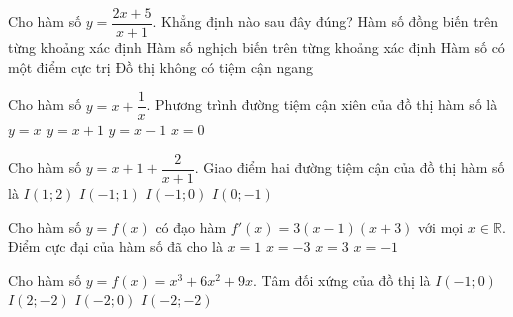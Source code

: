 \newpage
\begin{ex}
	Cho hàm số $y = \dfrac{2x + 5}{x + 1}$. Khẳng định nào sau đây đúng?
	\choice
	{Hàm số đồng biến trên từng khoảng xác định}
	{\True Hàm số nghịch biến trên từng khoảng xác định}
	{Hàm số có một điểm cực trị}
	{Đồ thị không có tiệm cận ngang}
\end{ex}

\begin{ex}
	Cho hàm số $y = x + \dfrac{1}{x}$. Phương trình đường tiệm cận xiên của đồ thị hàm số là
	\choice
	{\True $y = x$}
	{$y = x + 1$}
	{$y = x - 1$}
	{$x = 0$}
\end{ex}

\begin{ex}
	Cho hàm số $y = x + 1 + \dfrac{2}{x + 1}$. Giao điểm hai đường tiệm cận của đồ thị hàm số là
	\choice
	{$I(1; 2)$}
	{$I(-1; 1)$}
	{\True $I(-1; 0)$}
	{$I(0; -1)$}
\end{ex}

\begin{ex}
	Cho hàm số $y = f(x)$ có đạo hàm $f'(x) = 3(x - 1)(x + 3)$ với mọi $x \in \mathbb{R}$. Điểm cực đại của hàm số đã cho là
	\choice
	{$x = 1$}
	{\True $x = -3$}
	{$x = 3$}
	{$x = -1$}
\end{ex}

\begin{ex}
	Cho hàm số $y = f(x) = x^3 + 6x^2 + 9x$. Tâm đối xứng của đồ thị là
	\choice
	{$I(-1; 0)$}
	{$I(2; -2)$}
	{$I(-2; 0)$}
	{\True $I(-2; -2)$}
\end{ex}

